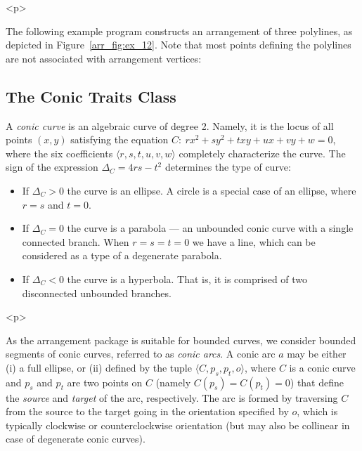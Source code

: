 \begin{ccHtmlOnly}<p>\end{ccHtmlOnly}
The following example program constructs an arrangement of three
polylines, as depicted in Figure~\ref{arr_fig:ex_12}. Note that
most points defining the polylines are not associated with arrangement
vertices:


\subsection{The Conic Traits Class}
\label{arr_ssec:tr_conic}
%
A {\em conic curve} is an algebraic curve of degree 2. Namely, it
is the locus of all points $(x,y)$ satisfying the equation $C:\ r
x^2 + s y^2 + t xy + u x + v y + w = 0$, where the six
coefficients $\langle r, s, t, u, v, w \rangle$ completely
characterize the curve. The sign of the expression $\Delta_{C} = 4
r s - t^2$ determines the type of curve:
\begin{itemize}
\item If $\Delta_{C} > 0$ the curve is an ellipse. A circle is a
special case of an ellipse, where $r = s$ and $t = 0$.
%
\item If $\Delta_{C} = 0$ the curve is a parabola --- an unbounded
conic curve with a single connected branch. When $r = s = t = 0$
we have a line, which can be considered as a type of a degenerate
parabola.
%
\item If $\Delta_{C} < 0$ the curve is a hyperbola. That is, it
is comprised of two disconnected unbounded branches.
\end{itemize}

\begin{ccHtmlOnly}<p>\end{ccHtmlOnly}
As the arrangement package is suitable for bounded curves, we
consider bounded segments of conic curves, referred to as {\em
conic arcs}. A conic arc $a$ may be either (i) a full ellipse, or
(ii) defined by the tuple $\langle C, p_s, p_t, o \rangle$, where
$C$ is a conic curve and $p_s$ and $p_t$ are two points on $C$
(namely $C(p_s) = C(p_t) = 0$) that define the {\em source} and
{\em target} of the arc, respectively. The arc is formed by
traversing $C$ from the source to the target going in the
orientation specified by $o$, which is typically clockwise or
counterclockwise orientation (but may also be collinear in case of
degenerate conic curves).

